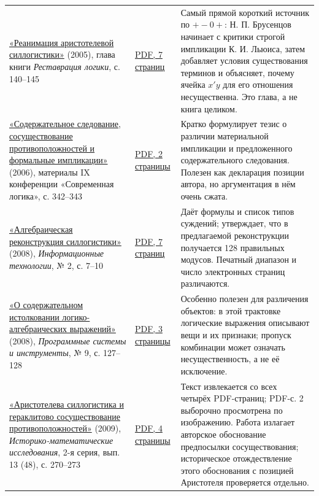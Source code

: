 \documentclass[12pt,a4paper]{article}
\begin{document}
\begin{longtable}{P{0.260\textwidth}P{0.300\textwidth}P{0.360\textwidth}}
\href{https://ternarycomp.cs.msu.ru/Papers/Rea.pdf}{«Реанимация аристотелевой силлогистики»} (2005), глава книги \emph{Реставрация логики}, с. 140–145 & \href{../sources/pdfs/Брусенцов_Реанимация-аристотелевой-силлогистики_2005-глава-из-Реставрации-логики.pdf}{PDF, 7 страниц} & Самый прямой короткий источник по \(+-0+\): Н. П. Брусенцов начинает с критики строгой импликации К. И. Льюиса, затем добавляет условия существования терминов и объясняет, почему ячейка \(x'y\) для его отношения несущественна. Это глава, а не книга целиком. \\
\href{https://ternarycomp.cs.msu.ru/Papers/Soder_sled.pdf}{«Содержательное следование, сосуществование противоположностей и формальные импликации»} (2006), материалы IX конференции «Современная логика», с. 342–343 & \href{../sources/pdfs/Брусенцов_Содержательное-следование-и-формальные-импликации_2006.pdf}{PDF, 2 страницы} & Кратко формулирует тезис о различии материальной импликации и предложенного содержательного следования. Полезен как декларация позиции автора, но аргументация в нём очень сжата. \\
\href{https://ternarycomp.cs.msu.ru/Papers/Alrek.pdf}{«Алгебраическая реконструкция силлогистики»} (2008), \emph{Информационные технологии}, № 2, с. 7–10 & \href{../sources/pdfs/Брусенцов_Алгебраическая-реконструкция-силлогистики_2008.pdf}{PDF, 7 страниц} & Даёт формулы и список типов суждений; утверждает, что в предлагаемой реконструкции получается 128 правильных модусов. Печатный диапазон и число электронных страниц различаются. \\
\href{https://ternarycomp.cs.msu.ru/Papers/Sborn9.pdf}{«О содержательном истолковании логико-алгебраических выражений»} (2008), \emph{Программные системы и инструменты}, № 9, с. 127–128 & \href{../sources/pdfs/Брусенцов_О-содержательном-истолковании-логико-алгебраических-выражений_2008.pdf}{PDF, 3 страницы} & Особенно полезен для различения объектов: в этой трактовке логические выражения описывают вещи и их признаки; пропуск комбинации может означать несущественность, а не её исключение. \\
\href{https://ternarycomp.cs.msu.ru/Papers/Arger.pdf}{«Аристотелева силлогистика и гераклитово сосуществование противоположностей»} (2009), \emph{Историко-математические исследования}, 2-я серия, вып. 13 (48), с. 270–273 & \href{../sources/pdfs/Брусенцов_Аристотелева-силлогистика-и-сосуществование-противоположностей_2009.pdf}{PDF, 4 страницы} & Текст извлекается со всех четырёх PDF-страниц; PDF-с. 2 выборочно просмотрена по изображению. Работа излагает авторское обоснование предпосылки сосуществования; историческое отождествление этого обоснования с позицией Аристотеля проверяется отдельно. \\

\end{longtable}
\end{document}
